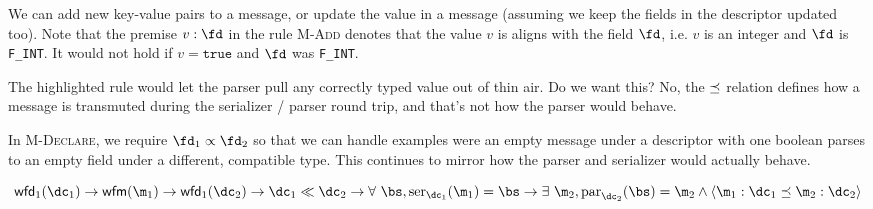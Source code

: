 We can add new key-value pairs to a message, or update the value in a message
(assuming we keep the fields in the descriptor updated too). Note that the
premise $v : \fd$ in the rule \textsc{M-Add} denotes that the value $v$ is aligns
with the field $\fd$, i.e. $v$ is an integer and $\fd$ is \verb|F_INT|. It would not
hold if $v = \mathtt{true}$ and $\fd$ was \verb|F_INT|.

The highlighted rule would let the parser pull any correctly typed value out of
thin air. Do we want this? No, the $\preceq$ relation defines how a message is
transmuted during the serializer / parser round trip, and that's not how the
parser would behave.

In \textsc{M-Declare}, we require $\fd_1 \fieldrel \fd_2$ so that we can handle examples
were an empty message under a descriptor with one boolean parses to an empty
field under a different, compatible type. This continues to mirror how the
parser and serializer would actually behave.

\vspace{1em}
\begin{theorem}\label{thm:inter-compat}
  \[
    \wfd{\dc_1} \rightarrow \wfm{\m_1} \rightarrow \wfd{\dc_2}
    \rightarrow \dc_1 \dcompat \dc_2 \rightarrow \forall\ \bs, \mathrm{ser}_{\dc_1}(\m_1) =
    \bs \rightarrow \exists\ \m_2, \mathrm{par}_{\dc_2}(\bs) = \m_2 \wedge \langle \m_1
    : \dc_1 \msgrel \m_2 : \dc_2 \rangle
  \] 
\end{theorem}

